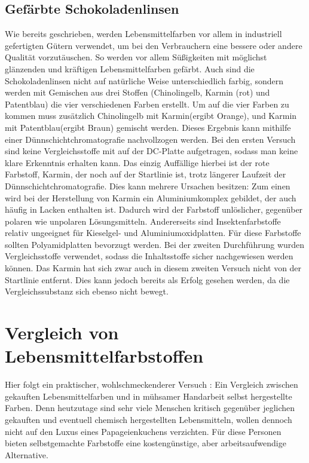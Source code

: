 \documentclass[11pt]{scrreprt}
\begin{document}
\section{Gefärbte Schokoladenlinsen}
Wie bereits geschrieben, werden Lebensmittelfarben vor allem in industriell gefertigten Gütern verwendet, um bei den Verbrauchern eine bessere oder andere Qualität vorzutäuschen. So werden vor allem Süßigkeiten mit möglichst glänzenden und kräftigen Lebensmittelfarben gefärbt. Auch sind die Schokoladenlinsen nicht auf natürliche Weise unterschiedlich farbig, sondern werden mit Gemischen aus drei Stoffen (Chinolingelb, Karmin (rot) und Patentblau) die vier verschiedenen Farben erstellt. Um auf die vier Farben zu kommen muss zusätzlich Chinolingelb mit Karmin(ergibt Orange), und Karmin mit Patentblau(ergibt Braun) gemischt werden.
Dieses Ergebnis kann mithilfe einer Dünnschichtchromatografie nachvollzogen werden. Bei den ersten Versuch sind keine Vergleichsstoffe mit auf der DC-Platte aufgetragen, sodass man keine klare Erkenntnis erhalten kann. Das einzig Auffällige hierbei ist der rote Farbstoff, Karmin, der noch auf der Startlinie ist, trotz längerer Laufzeit der Dünnschichtchromatografie. Dies kann mehrere Ursachen besitzen: Zum einen wird bei der Herstellung von Karmin ein Aluminiumkomplex gebildet, der auch häufig in Lacken enthalten ist. Dadurch wird der Farbstoff unlöslicher, gegenüber polaren wie unpolaren Lösungsmitteln. Andererseits sind Insektenfarbstoffe relativ ungeeignet für Kieselgel- und Aluminiumoxidplatten. Für diese Farbstoffe sollten Polyamidplatten bevorzugt werden. Bei der zweiten Durchführung wurden Vergleichsstoffe verwendet, sodass die Inhaltsstoffe sicher nachgewiesen werden können. Das Karmin hat sich zwar auch in diesem zweiten Versuch nicht von der Startlinie entfernt. Dies kann jedoch bereits als Erfolg gesehen werden, da die Vergleichssubstanz sich ebenso nicht bewegt.

\chapter{Vergleich von Lebensmittelfarbstoffen}

 Hier folgt ein praktischer, wohlschmeckenderer Versuch : Ein Vergleich zwischen gekauften Lebensmittelfarben und in mühsamer Handarbeit selbst hergestellte Farben. Denn heutzutage sind sehr viele Menschen kritisch gegenüber jeglichen gekauften und eventuell chemisch hergestellten Lebensmitteln, wollen dennoch nicht auf den Luxus eines Papageienkuchens verzichten. Für diese Personen bieten selbstgemachte Farbstoffe eine kostengünstige, aber arbeitsaufwendige Alternative. 
 
\end{document}
